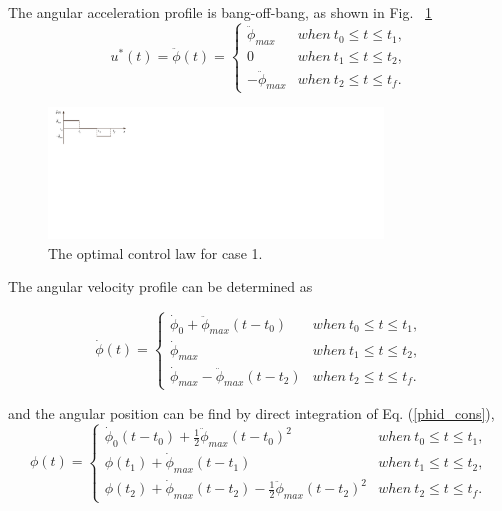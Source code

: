 \documentclass[journal ]{new-aiaa}
\begin{document}
	The angular acceleration profile is bang-off-bang, as shown in Fig. ~\ref{bang_off_bang}
	\begin{equation}\label{phidd_cons}
	u^*(t)=\ddot{\phi}(t)=\left\{
	\begin{array}{ll}
	\ddot{\phi}_{max}& when\  t_0\leq t\leq t_1,\\
	0& when\  t_1\leq t \leq t_2,\\
	-\ddot{\phi}_{max}& when \ t_2\leq t\leq t_f.
	\end{array}
	\right.
	\end{equation}

	\begin{figure}[h!]
	\centering
	\includegraphics[width=3.5in]{./Figures/bang_off_bang}
	\caption{The optimal control law for case 1.}
	\label{bang_off_bang}
	\end{figure}
 The angular velocity profile can be determined as

	\begin{equation}\label{phid_cons}
	\dot{\phi}(t)=\left\{
	\begin{array}{ll}
	\dot{\phi}_0+\ddot{\phi}_{max}(t-t_0)& when\  t_0\leq t\leq t_1,\\
	\dot{\phi}_{max}& when\  t_1\leq t \leq t_2,\\
	\dot{\phi}_{max}-\ddot{\phi}_{max}(t-t_2)& when \ t_2\leq t\leq t_f.
	\end{array}
	\right.
	\end{equation}

and the angular position can be find by direct integration of Eq. (\ref{phid_cons}),
	\begin{equation}\label{phi_cons}
	\phi(t)=\left\{
	\begin{array}{ll}
	\dot{\phi}_0(t-t_0)+\frac{1}{2}\ddot{\phi}_{max}(t-t_0)^2& when\  t_0\leq t\leq t_1,\\
	\phi(t_1)+ \dot{\phi}_{max}(t-t_1)& when\  t_1\leq t \leq t_2,\\
	\phi(t_2)+\dot{\phi}_{max}(t-t_2)-\frac{1}{2}\ddot{\phi}_{max}(t-t_2)^2& when \ t_2\leq t\leq t_f.
	\end{array}
	\right.
	\end{equation}
	
\end{document}
